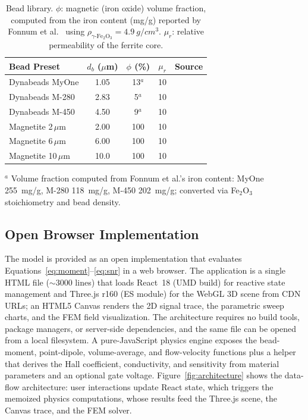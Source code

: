 \documentclass[micromachines,article,submit,pdftex,moreauthors]{Definitions/mdpi}
\begin{document}
\begin{table}[H]
\caption{Bead library. $\phi$: magnetic (iron oxide) volume fraction, computed from
the iron content (mg/g) reported by Fonnum et al.\ \cite{fonnum2005} using
$\rho_{\gamma\text{-Fe}_2\text{O}_3} = \SI{4.9}{g/cm^3}$. $\mu_r$: relative
permeability of the ferrite core.\label{tab:beads}}
\begin{tabularx}{\textwidth}{lCCCX}
\toprule
\textbf{Bead Preset} & \boldmath$d_b$ \textbf{($\mu$m)} &
\boldmath$\phi$ \textbf{(\%)} & \boldmath$\mu_r$ & \textbf{Source} \\
\midrule
Dynabeads MyOne   & 1.05 & 13$^{a}$ & 10 & \cite{fonnum2005} \\
Dynabeads M-280   & 2.83 & 5$^{a}$  & 10 & \cite{fonnum2005} \\
Dynabeads M-450   & 4.50 & 9$^{a}$  & 10 & \cite{fonnum2005} \\
Magnetite 2\,$\mu$m  & 2.00 & 100 & 10 & \cite{govindaraju2025} \\
Magnetite 6\,$\mu$m  & 6.00 & 100 & 10 & \cite{govindaraju2025} \\
Magnetite 10\,$\mu$m & 10.0 & 100 & 10 & \cite{govindaraju2025} \\
\bottomrule
\end{tabularx}
\noindent\footnotesize{$^{a}$ Volume fraction computed from Fonnum et al.'s iron
content: MyOne \SI{255}{mg/g}, M-280 \SI{118}{mg/g}, M-450 \SI{202}{mg/g};
converted via Fe$_2$O$_3$ stoichiometry and bead density.}
\end{table}

\subsection{Open Browser Implementation}
\label{sec:implementation}

The model is provided as an open implementation that evaluates
Equations~\eqref{eq:moment}--\eqref{eq:snr} in a web browser. The application is a
single HTML file (${\sim}\num{3000}$ lines) that loads React~18 (UMD build) for
reactive state management and Three.js r160 (ES module) for the WebGL 3D scene from
CDN URLs; an HTML5 Canvas renders the 2D signal trace, the parametric sweep charts,
and the FEM field visualization. The architecture requires no build tools, package
managers, or server-side dependencies, and the same file can be opened from a local
filesystem. A pure-JavaScript physics engine exposes the bead-moment,
point-dipole, volume-average, and flow-velocity functions plus a helper that derives
the Hall coefficient, conductivity, and sensitivity from material parameters and an
optional gate voltage. Figure~\ref{fig:architecture} shows the data-flow
architecture: user interactions update React state, which triggers the memoized
physics computations, whose results feed the Three.js scene, the Canvas trace, and
the FEM solver.
\end{document}
